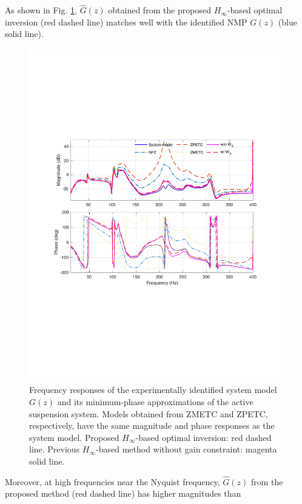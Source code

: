 \documentclass [11pt, proquest] {uwthesis}[2020/02/24]
\begin{document}
As shown in Fig. \ref{fig:Frequency-response-of_Hinf}, $\hat{G}(z)$
obtained from the proposed $H_{\infty}$-based optimal inversion (red
dashed line) matches well with the identified NMP $G(z)$ (blue solid
line).
\begin{figure}[!ht]
\begin{centering}
\includegraphics[width=13cm]{Model-inversion/suspension_all}
\par\end{centering}
\caption{\label{fig:Frequency-response-of_Hinf}Frequency responses of the
experimentally identified system model $G(z)$ and its minimum-phase
approximations of the active suspension system. Models obtained from
ZMETC and ZPETC, respectively, have the same magnitude and phase responses
as the system model. Proposed $H_{\infty}$-based optimal inversion:
red dashed line. Previous $H_{\infty}$-based method without gain
constraint: magenta solid line.}
\end{figure}
 Moreover, at high frequencies near the Nyquist frequency, $\hat{G}(z)$
from the proposed method (red dashed line) has higher magnitudes than
\end{document}
